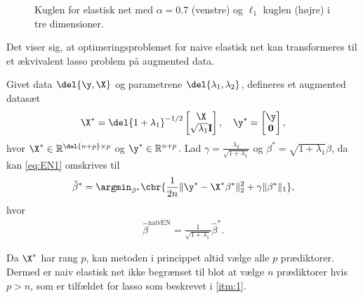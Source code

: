 %
\begin{figure}[H]
\centering
\caption{Kuglen for elastisk net med \(\alpha=0.7\) (venstre) og \(\ell_1\) kuglen (højre) i tre dimensioner.}
\label{fig:elastisk_net}
\end{figure}
%
Det viser sig, at optimeringsproblemet for naive elastisk net kan transformeres til et ækvivalent lasso problem på augmented data.
%
\begin{lem} \label{lem:elastisk_net}
Givet data \(\del{\y, \X}\) og parametrene \(\del{\lambda_1, \lambda_2}\), defineres et augmented datasæt 
\begin{align*}
\X^* = \del{1 + \lambda_1}^{-1/2} \begin{bmatrix}
\X \\ \sqrt{\lambda_1} \mathbf{I}
\end{bmatrix}, \quad \y^* = \begin{bmatrix}
\y \\ \mathbf{0}
\end{bmatrix},
\end{align*}
hvor \(\X^* \in \mathbb{R}^{\del{n+p} \times p}\) og \(\y^* \in \mathbb{R}^{n+p}\).
Lad \(\gamma = \frac{\lambda_2}{\sqrt{1+\lambda_1}}\) og \(\beta^* = \sqrt{1+\lambda_1} \beta\), da kan \eqref{eq:EN1} omskrives til
\begin{align*}
\hat{\beta}^* = \argmin_{\beta^*} \cbr{\frac{1}{2n} \Vert \y^* - \X^* \beta^* \Vert_2^2 +\gamma \Vert \beta^* \Vert_1},
\end{align*}
hvor
\begin{align*}
\hat{\beta}^\text{naivEN} = \frac{1}{\sqrt{1+\lambda_1}} \hat{\beta}^*.
\end{align*}
\end{lem}
%
Da \(\X^*\) har rang \(p\), kan metoden i princippet altid vælge alle \(p\) prædiktorer.
Dermed er naiv elastisk net ikke begrænset til blot at vælge \(n\) prædiktorer hvis \(p > n\), som er tilfældet for lasso som beskrevet i \ref{itm:1}.
